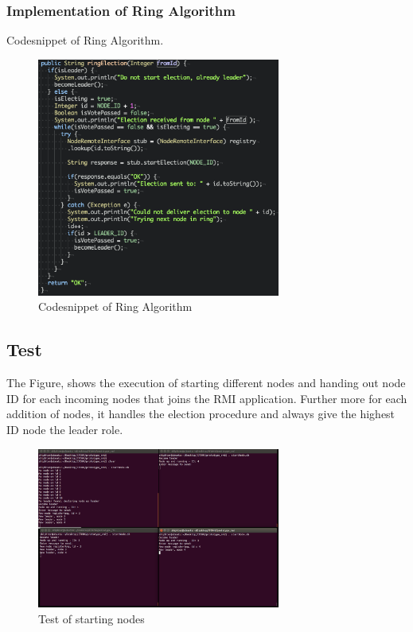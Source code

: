 \newpage

\subsubsection{Implementation of Ring Algorithm}
Codesnippet of Ring Algorithm.

\begin{figure}[ht]
\centering
\includegraphics[width=80mm]{img/ring_election_code.png}
\caption{Codesnippet of Ring Algorithm}
\label{Codesnippet of Ring Algorithm}
\end{figure}


\subsection{Test}

The Figure, shows the execution of starting different nodes and handing out node ID for each incoming nodes that joins the RMI application. Further more for each addition of nodes, it handles the election procedure and always give the highest ID node the leader role.

\begin{figure}[ht!]
\centering
\includegraphics[width=80mm]{img/starting_nodes.png}
\caption{Test of starting nodes}
\label{Test of starting Nodes}
\end{figure}

